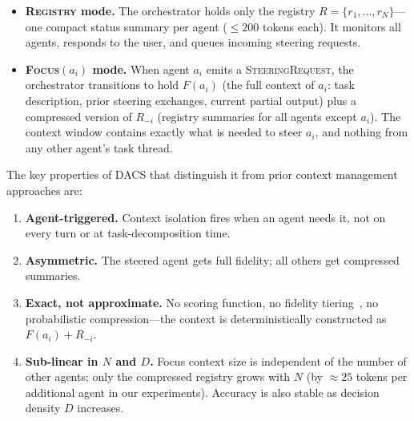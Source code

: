 \documentclass{article}
\begin{document}
\begin{itemize}
  \item \textbf{\textsc{Registry} mode.} The orchestrator holds only the
  registry $R = \{r_1, \ldots, r_N\}$—one compact status summary per
  agent ($\leq 200$ tokens each).
  It monitors all agents, responds to the user, and queues incoming
  steering requests.

  \item \textbf{\textsc{Focus}$(a_i)$ mode.} When agent $a_i$ emits a
  \textsc{SteeringRequest}, the orchestrator transitions to hold $F(a_i)$
  (the full context of $a_i$: task description, prior steering exchanges,
  current partial output) plus a compressed version of $R_{-i}$
  (registry summaries for all agents except $a_i$).
  The context window contains exactly what is needed to steer $a_i$,
  and nothing from any other agent's task thread.
\end{itemize}

The key properties of DACS that distinguish it from prior context
management approaches are:
\begin{enumerate}
  \item \textbf{Agent-triggered.} Context isolation fires when an agent
  needs it, not on every turn or at task-decomposition time.
  \item \textbf{Asymmetric.} The steered agent gets full fidelity;
  all others get compressed summaries.
  \item \textbf{Exact, not approximate.} No scoring function, no fidelity
  tiering~\citep{afm2024,lemon2025}, no probabilistic compression—the
  context is deterministically constructed as $F(a_i) + R_{-i}$.
  \item \textbf{Sub-linear in $N$ and $D$.} Focus context size is
  independent of the number of other agents; only the compressed registry
  grows with $N$ (by $\approx 25$ tokens per additional agent in our
  experiments). Accuracy is also stable as decision density $D$ increases.
\end{enumerate}
\end{document}
